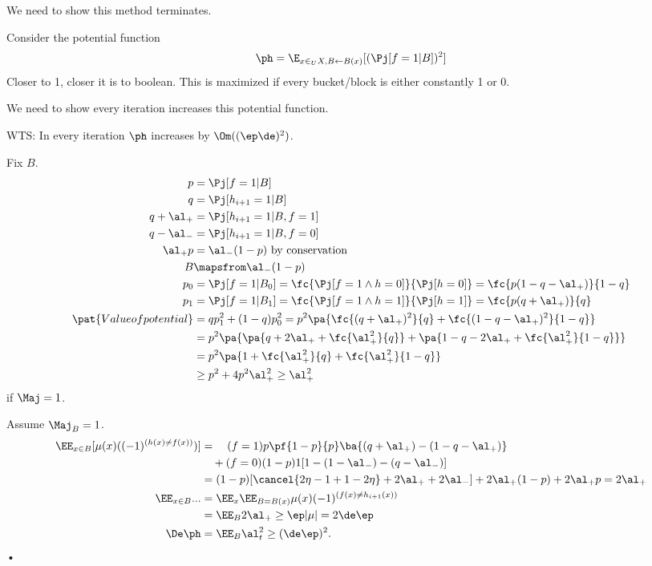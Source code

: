 We need to show this method terminates.

Consider the potential function
$$
\ph = \E_{x\in_U X, B\leftarrow B(x)} [(\Pj[f=1|B])^2]
$$
Closer to 1, closer it is to boolean. This is maximized if every bucket/block is either constantly 1 or 0.

We need to show every iteration increases this potential 
function.




WTS: In every iteration $\ph$ increases by $\Om((\ep \de)^2)$. 

Fix $B$. 
\begin{align}
p&=\Pj[f=1|B]\\
q&=\Pj[h_{i+1} = 1|B]\\ %
q+\al_+ &= \Pj[h_{i+1}=1|B, f=1]\\ %
q-\al_- &= \Pj[h_{i+1}=1|B, f=0]\\ %
\al_+p &= \al_-(1-p) \text{ by conservation}\\
B&\mapsfrom \al_-(1-p)\\
p_0&= \Pj[f=1|B_0] = \fc{\Pj[f=1\wedge h=0]}{\Pj[h=0]} = \fc{p(1-q-\al_+)}{1-q}\\
p_1&= \Pj[f=1|B_1] = \fc{\Pj[f=1\wedge h=1]}{\Pj[h=1]} = \fc{p(q+\al_+)}{q}\\
\pat{Value of potential}&=qp_1^2 + (1-q)p_0^2 = p^2 \pa{\fc{(q+\al_+)^2}{q} + \fc{(1-q-\al_+)^2}{1-q}} \\
&=p^2\pa{
\pa{q+2\al_+ + \fc{\al_+^2}{q}}
+
\pa{1-q-2\al_+ + \fc{\al_+^2}{1-q}}
}
\\
&=p^2\pa{1+\fc{\al_+^2}{q} + \fc{\al_+^2}{1-q}}\\
&\ge p^2 + 4p^2 \al_+^2 \ge
 \al_+^2
\end{align}
if $\Maj=1$.

Assume $\Maj_B=1$. 
\begin{align}
\EE_{x\in B}[\mu(x) ((-1)^{(h(x)\ne f(x))})]
&=\quad (f=1) p\pf{1-p}{p} \ba{(q+\al_+) - (1-q-\al_+)}\\
&\quad + (f=0) (1-p) 1 [1-(1-\al_-) - (q-\al_-)]\\
&=(1-p) [\cancel{2\eta - 1 + 1-2 \eta} + 2\al_++2\al_-]
 + 2\al_+(1-p) + 2\al_+p=2\al_+\\
\EE_{x\in B} ... &= \EE_x \EE_{B= B(x)} \mu(x) (-1)^{(f(x)\ne h_{i+1}(x))}\\
&= \EE_B 2\al_+ \ge \ep |\mu| = 2\de \ep\\
\De \ph &= \EE_B \al_t^2 \ge (\de\ep)^2.
\end{align}•

